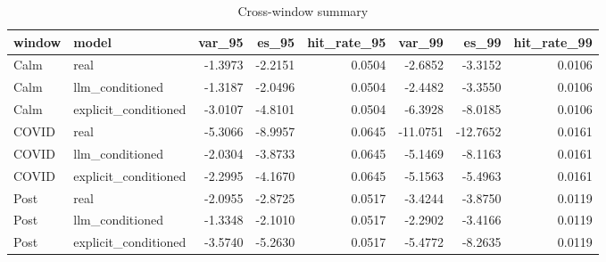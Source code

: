 \begin{table}
\caption{Cross-window summary}
\label{tab:period_summary}
\begin{tabular}{llrrrrrr}
\toprule
window & model & var\_95 & es\_95 & hit\_rate\_95 & var\_99 & es\_99 & hit\_rate\_99 \\
\midrule
Calm & real & -1.3973 & -2.2151 & 0.0504 & -2.6852 & -3.3152 & 0.0106 \\
Calm & llm\_conditioned & -1.3187 & -2.0496 & 0.0504 & -2.4482 & -3.3550 & 0.0106 \\
Calm & explicit\_conditioned & -3.0107 & -4.8101 & 0.0504 & -6.3928 & -8.0185 & 0.0106 \\
COVID & real & -5.3066 & -8.9957 & 0.0645 & -11.0751 & -12.7652 & 0.0161 \\
COVID & llm\_conditioned & -2.0304 & -3.8733 & 0.0645 & -5.1469 & -8.1163 & 0.0161 \\
COVID & explicit\_conditioned & -2.2995 & -4.1670 & 0.0645 & -5.1563 & -5.4963 & 0.0161 \\
Post & real & -2.0955 & -2.8725 & 0.0517 & -3.4244 & -3.8750 & 0.0119 \\
Post & llm\_conditioned & -1.3348 & -2.1010 & 0.0517 & -2.2902 & -3.4166 & 0.0119 \\
Post & explicit\_conditioned & -3.5740 & -5.2630 & 0.0517 & -5.4772 & -8.2635 & 0.0119 \\
\bottomrule
\end{tabular}
\end{table}
